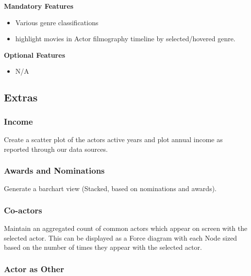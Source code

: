 \documentclass[12pt]{article}
\begin{document}
 

 
 \vspace{2em}
 
 \textbf{Mandatory Features}
 \begin{itemize}
  	\item Various genre classifications
  	\item highlight movies in Actor filmography timeline by selected/hovered genre.	
 \end{itemize}

\vspace{2em}
 
 \textbf{Optional Features}
\begin{itemize}
	\item N/A
\end{itemize}

\newpage 
\subsection{Extras}
\subsubsection{Income}

Create a scatter plot of the actors active years and plot annual income as reported through our data sources.

\subsubsection{Awards and Nominations}

Generate a barchart view (Stacked, based on nominations and awards).

\subsubsection{Co-actors}

Maintain an aggregated count of common actors which appear on screen with the selected actor.  This can be displayed as a Force diagram with each Node sized based on the number of times they appear with the selected actor.

\subsubsection{Actor as Other}
\end{document}
